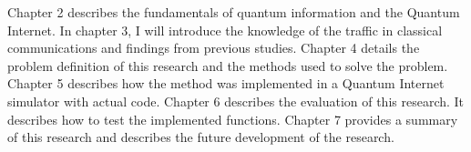 Chapter 2 describes the fundamentals of quantum information and the Quantum Internet.
In chapter 3, I will introduce the knowledge of the traffic in classical communications and findings from previous studies.
Chapter 4 details the problem definition of this research and the methods used to solve the problem.
Chapter 5 describes how the method was implemented in a Quantum Internet simulator with actual code.
Chapter 6 describes the evaluation of this research. It describes how to test the implemented functions.
Chapter 7 provides a summary of this research and describes the future development of the research.


